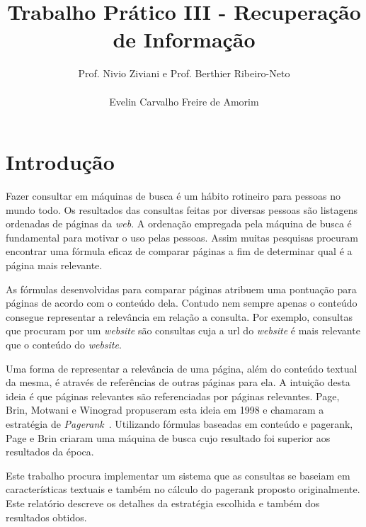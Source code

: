 \documentclass[a4paper]{article}
\begin{document}


\title{Trabalho Prático III - Recuperação de Informação}
\author{Prof. Nivio Ziviani e Prof. Berthier Ribeiro-Neto \\ \\ Evelin Carvalho Freire de Amorim}

\maketitle

\tableofcontents 

\section{Introdução}

Fazer consultar em máquinas de busca é um hábito rotineiro para pessoas no mundo todo. 
Os resultados das consultas feitas por diversas pessoas são listagens ordenadas de 
páginas da \emph{web}. A ordenação empregada pela máquina de busca é fundamental 
para motivar o uso pelas pessoas. Assim muitas pesquisas procuram encontrar uma fórmula 
eficaz de comparar páginas a fim de determinar qual é a página mais relevante.

As fórmulas desenvolvidas para comparar páginas atribuem uma pontuação para páginas 
de acordo com o conteúdo dela. Contudo nem sempre apenas o conteúdo consegue representar 
a relevância em relação a consulta. Por exemplo, consultas que procuram por um 
\emph{website} são consultas cuja a url do \emph{website} é mais relevante que o 
conteúdo do \emph{website}. 

Uma forma de representar a relevância de uma página, além do conteúdo textual da mesma, 
é através de referências de outras páginas para ela. A intuição desta ideia é que páginas 
relevantes são referenciadas por páginas relevantes. Page, Brin, Motwani e Winograd
propuseram esta ideia em 1998 e chamaram a estratégia de \emph{Pagerank}~\cite{page1999pagerank}. 
Utilizando fórmulas baseadas em conteúdo e pagerank, Page e Brin criaram uma máquina de 
busca cujo resultado foi superior aos resultados da época. 

Este trabalho procura implementar um sistema que as consultas se baseiam em 
características textuais e também no cálculo do pagerank proposto originalmente. Este 
relatório descreve os detalhes da estratégia escolhida e também dos resultados obtidos.
\end{document}
